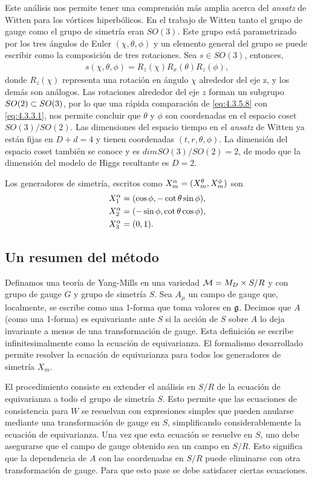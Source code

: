 Este análisis nos permite tener una comprensión más amplia acerca del \emph{ansatz} de Witten para los vórtices hiperbólicos. En el trabajo de Witten tanto el grupo de gauge como el grupo de simetría eran $SO(3)$. Este grupo está parametrizado por los tres ángulos de Euler $(\chi,\theta,\phi)$ y un elemento general del grupo se puede escribir como la composición de tres rotaciones. Sea $s\in SO(3)$, entonces,
\begin{align}
	s(\chi,\theta,\phi) = R_z(\chi)R_x(\theta)R_z(\phi), \label{eq:4.3.5.8}
\end{align}
donde $R_z(\chi)$ representa una rotación en ángulo $\chi$ alrededor del eje z, y los demás son análogos. Las rotaciones alrededor del eje $z$ forman un subgrupo $SO(2)\subset SO(3)$, por lo que una rápida comparación de  \eqref{eq:4.3.5.8} con \eqref{eq:4.3.3.1}, nos permite concluir que $\theta$ y $\phi$ son coordenadas en el espacio coset $SO(3)/SO(2)$. Las dimensiones del espacio tiempo en el \emph{ansatz} de Witten ya están fijas en $D+d=4$ y tienen coordenadas $(t,r,\theta,\phi)$. La dimensión del espacio coset también se conoce y es $dim SO(3)/SO(2)=2$, de modo que la dimensión del modelo de Higgs resultante es $D=2$.

Los generadores de simetría, escritos como $X^\alpha_m=(X^\theta_m,X^\phi_m)$ son
\begin{align}
	X^\alpha_1 &= (\cos\phi,-\cot\theta\sin\phi),\\
	X^\alpha_2 &= (-\sin\phi,\cot\theta\cos\phi),\\
	X^\alpha_3 &=(0,1).
\end{align}

\subsection{Un resumen del método}

Definamos una teoría de Yang-Mills en una variedad $\mathcal{M}=M_D\times S/R$ y con grupo de gauge $G$ y grupo de simetría $S$. Sea $A_\mu$ un campo de gauge que, localmente, se escribe como una 1-forma  que toma valores en $\mathfrak{g}$. Decimos que $A$ (como una 1-forma) es equivariante ante $S$ si la acción de $S$ sobre $A$ lo deja invariante a menos de una transformación de gauge. Esta definición se escribe infinitesimalmente como la ecuación de equivarianza. El formalismo desarrollado permite resolver la ecuación de equivarianza para todos los generadores de simetría $X_m$. 

El procedimiento consiste en extender el análisis en $S/R$ de la ecuación de equivarianza a todo el grupo de simetría $S$. Esto permite que las ecuaciones de consistencia para $W$ se resuelvan con expresiones simples que pueden anularse mediante una transformación de gauge en $S$, simplificando considerablemente la ecuación de equivarianza. Una vez que esta ecuación se resuelve en $S$, uno debe asegurarse que el campo de gauge obtenido sea un campo en $S/R$. Esto significa que la dependencia de $A$ con las coordenadas en $S/R$ puede eliminarse con otra transformación de gauge. Para que esto pase se debe satisfacer ciertas ecuaciones.

